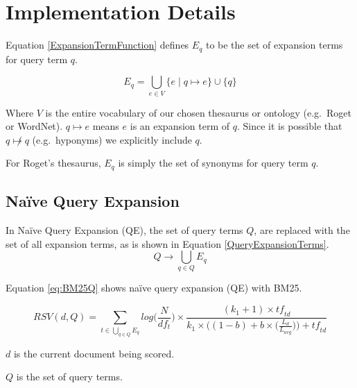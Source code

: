 \newpage
\section{Implementation Details} \label{math}
Equation \eqref{ExpansionTermFunction} defines $E_q$ to be the set of expansion terms for query term $q$.

\begin{equation} \label{ExpansionTermFunction}
	E_q = \bigcup_{e \in V} \{ e \mid q \mapsto e \} \cup \{ q \}
\end{equation}

\noindent
Where $V$ is the entire vocabulary of our chosen thesaurus or ontology (e.g.\ Roget or WordNet). $q \mapsto e$ means $e$ is an expansion term of $q$. Since it is possible that $q\not\mapsto q$ (e.g.\ hyponyms) we explicitly include $q$. 

For Roget's thesaurus, $E_q$ is simply the set of synonyms for query term $q$.

\subsection{Na{\"i}ve Query Expansion}
In Na{\"i}ve Query Expansion (QE), the set of query terms $Q$, are replaced with the set of all expansion terms, as is shown in Equation \eqref{QueryExpansionTerms}.
\begin{equation} \label{QueryExpansionTerms}
	Q \rightarrow  \bigcup_{q \in Q} E_q
\end{equation}

\noindent
Equation \eqref{eq:BM25Q} shows na{\"i}ve query expansion (QE) with BM25.

\begin{equation} \label{eq:BM25Q}
	RSV(d, Q) = \sum_{t \in \bigcup_{q \in Q} E_q}
	log \Big( \frac{N}{df_{t}} \Big) \times
	\frac{(k_1 + 1) \times \mathit{tf}_{\!td}}{k_1 \times \Big((1-b) + b \times \Big(\frac{L_d}{L_{avg}}\Big) \Big) + \mathit{tf}_{\!td}} 
\end{equation}

\noindent
$d$ is the current document being scored.

\noindent
$Q$ is the set of query terms.


